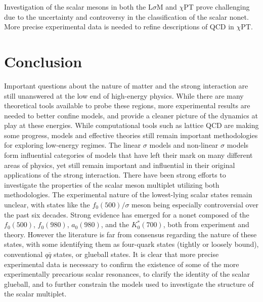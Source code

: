 \documentclass[aps,prd,onecolumn,showpacs,amsmath,amssymb,nofootinbib]{revtex4} \pdfoutput=1
\newcommand{\lsm}{L$\sigma$M}
\newcommand{\cpt}{$\chi$PT}
\begin{document}
Investigation of the scalar mesons in both the {\lsm} and {\cpt} prove challenging due to the uncertainty and controversy in the classification of the scalar nonet. More precise experimental data is needed to refine descriptions of QCD in {\cpt}.

\section{Conclusion}
Important questions about the nature of matter and the strong interaction are still unanswered at the low end of high-energy physics. While there are many theoretical tools available to probe these regions, more experimental results are needed to better confine models, and provide a cleaner picture of the dynamics at play at these energies. While computational tools such as lattice QCD are making some progress, models and effective theories still remain important methodologies for exploring low-energy regimes. The linear $\sigma$ models and non-linear $\sigma$ models form influential categories of models that have left their mark on many different areas of physics, yet still remain important and influential in their original applications of the strong interaction. There have been strong efforts to investigate the properties of the scalar meson multiplet utilizing both methodologies. The experimental nature of the lowest-lying scalar states remain unclear, with states like the $f_0(500)/\sigma$ meson being especially controversial over the past six decades. Strong evidence has emerged for a nonet composed of the $f_0(500)$, $f_0(980)$, $a_0(980)$, and the $K^{*}_0(700)$, both from experiment and theory. However the literature is far from consensus regarding the nature of these states, with some identifying them as four-quark states (tightly or loosely bound), conventional $q\bar{q}$ states, or glueball states. It is clear that more precise experimental data is necessary to confirm the existence of some of the more experimentally precarious scalar resonances, to clarify the identity of the scalar glueball, and to further constrain the models used to investigate the structure of the scalar multiplet. 
\clearpage
%

\end{document}
